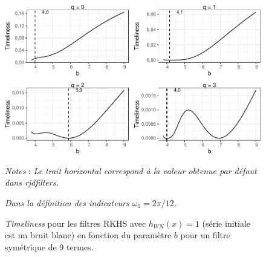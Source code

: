 \documentclass[
  11pt,
  french,
  a4paper]{article}
\newcommand\1{\mathds{1}}
\begin{document}
\begin{figure}[H]

{\centering \includegraphics{img/bookdown/pdf/rkhstimeliness4wn-1} 

}

\caption[\emph{Timeliness} pour les filtres RKHS avec \(h_{WN}(x)=1\) (série initiale est un bruit blanc) en fonction du paramètre \(b\) pour un filtre symétrique de 9 termes]{\emph{Timeliness} pour les filtres RKHS avec \(h_{WN}(x)=1\) (série initiale est un bruit blanc) en fonction du paramètre \(b\) pour un filtre symétrique de 9 termes.}\label{fig:rkhstimeliness4wn}

\footnotesize


\emph{Notes} : \emph{Le trait horizontal correspond à la valeur obtenue par défaut dans rjdfilters.}

\emph{Dans la définition des indicateurs \(\omega_1=2\pi/12\).}
\normalsize\end{figure}
\end{document}
